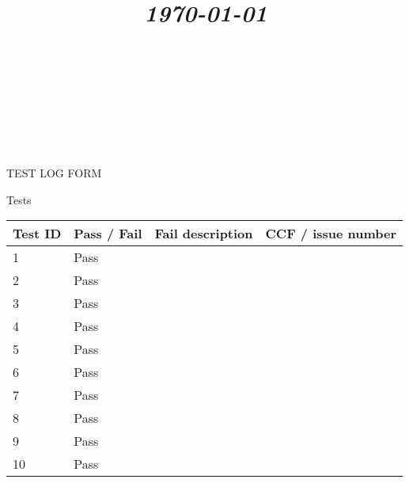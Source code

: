 \documentclass{article}
\title{
	\vspace{1.2in}
	\textmd{\textbf{\doctitle}} \\
	\vspace{0.1in}\large{\textit{\today}} \\
	\vspace{0.4in}
	{\bf{\qanumber}} \\ \vspace{0.4in} %
	\version \\
	\status \\
	\vspace{0.4in}
}
\author{\authors}
\date{}
\begin{document}
	\maketitle
	\newpage
	\tableofcontents
	\newpage

	\begin{section}{TEST LOG FORM}
		\begin{subsection}{Tests}
			\begin{tabularx}{\linewidth}{| p{1.5cm} | p{2cm} | p{9cm} | X |}
				\hline
				\bf{Test ID} & \bf{Pass / Fail} & \bf{Fail description} & \bf{CCF / issue number} \\
				\hline
1
&
Pass
&

&

\\
\hline

2
&
Pass
&

&

\\
\hline 

3
&
Pass
&

&

\\
\hline

4
&
Pass
&

&

\\
\hline

5
&
Pass
&

&

\\
\hline

6
&
Pass
&

&

\\
\hline

7
&
Pass
&

&

\\
\hline

8
&
Pass
&

&

\\
\hline

9
&
Pass
&

&

\\
\hline

10
&
Pass
&

&

\\
\hline


\end{tabularx}
\end{subsection}
\end{section}
\end{document}
